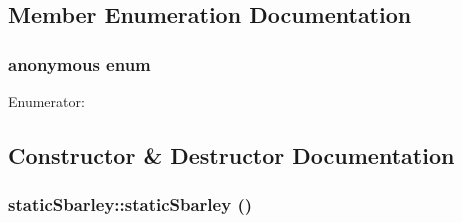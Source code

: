 \subsection{Member Enumeration Documentation}
\hypertarget{classstatic_sbarley_af5dc35adc9b23d34384d30da8097a715}{
\subsubsection[{"@24}]{\setlength{\rightskip}{0pt plus 5cm}anonymous enum}}
\label{classstatic_sbarley_af5dc35adc9b23d34384d30da8097a715}
\begin{Desc}
\item[Enumerator: ]\par
\begin{description}
\item[{\em 
\hypertarget{classstatic_sbarley_af5dc35adc9b23d34384d30da8097a715a67e0023c1714c59989f0dc245aadb552}{
Num\_\-of\_\-pr\_\-str}
\label{classstatic_sbarley_af5dc35adc9b23d34384d30da8097a715a67e0023c1714c59989f0dc245aadb552}
}]\item[{\em 
\hypertarget{classstatic_sbarley_af5dc35adc9b23d34384d30da8097a715a82ba905e2d8d5d51789e76f694e19309}{
Nitrogen\_\-levels}
\label{classstatic_sbarley_af5dc35adc9b23d34384d30da8097a715a82ba905e2d8d5d51789e76f694e19309}
}]\end{description}
\end{Desc}



\subsection{Constructor \& Destructor Documentation}
\hypertarget{classstatic_sbarley_a5468c834072d3a9ef96d2cc6985f1d23}{
\subsubsection[{staticSbarley}]{\setlength{\rightskip}{0pt plus 5cm}staticSbarley::staticSbarley ()}}
\label{classstatic_sbarley_a5468c834072d3a9ef96d2cc6985f1d23}


